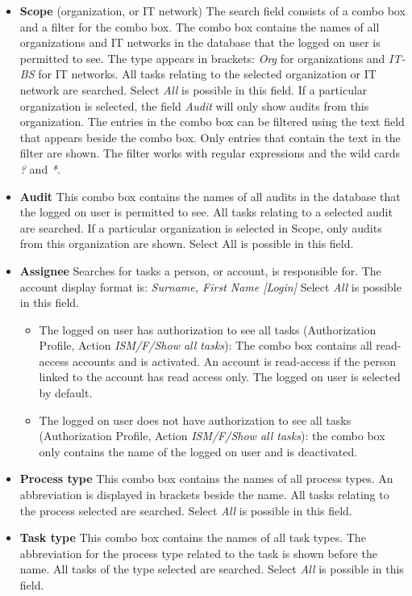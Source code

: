 \documentclass[a4paper,10pt]{book}
\begin{document}
\begin{itemize}
\item \textbf{Scope} (organization, or IT network) The search field consists of a combo box and a filter for the combo box. The combo box contains the names of all organizations and IT networks in the database that the logged on user is permitted to see. The type appears in brackets: \textit{Org} for organizations and \textit{IT-BS} for IT networks. All tasks relating to the selected organization or IT network are searched. Select \textit{All} is possible in this field. If a particular organization is selected, the field \textit{Audit} will only show audits from this organization. The entries in the combo box can be filtered using the text field that appears beside the combo box. Only entries that contain the text in the filter are shown. The filter works with regular expressions and the wild cards \textit{?} and \textit{*}.
\item \textbf{Audit} This combo box contains the names of all audits in the database that the logged on user is permitted to see. All tasks relating to a selected audit are searched. If a particular organization is selected in Scope, only audits from this organization are shown. Select All is possible in this field.
\item \textbf{Assignee} Searches for tasks a person, or account, is responsible for. The account display format is: \textit{Surname, First Name [Login]} Select \textit{All} is possible in this field.
\begin{itemize}
\item The logged on user has authorization to see all tasks (Authorization Profile, Action \textit{ISM/F/Show all tasks}): The combo box contains all read-access accounts and is activated. An account is read-access if the person linked to the account has read access only. The logged on user is selected by default.
\item The logged on user does not have authorization to see all tasks (Authorization Profile, Action \textit{ISM/F/Show all tasks}): the combo box only contains the name of the logged on user and is deactivated.
\end{itemize}
\item \textbf{Process type} This combo box contains the names of all process types. An abbreviation is displayed in brackets beside the name. All tasks relating to the process selected are searched. Select \textit{All} is possible in this field.
\item \textbf{Task type} This combo box contains the names of all task types. The abbreviation for the process type related to the task is shown before the name. All tasks of the type selected are searched. Select \textit{All} is possible in this field.

\end{itemize}
\end{document}
